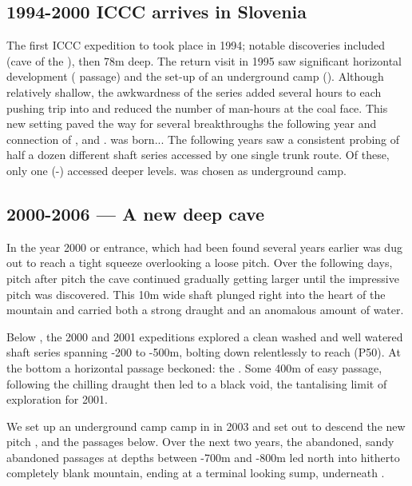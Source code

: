 \subsection{1994-2000  ICCC arrives in Slovenia} The first ICCC expedition to  took place in 1994; notable discoveries included  (cave of the ), then 78m deep. The return visit in 1995 saw significant horizontal development ( passage) and the set-up of an underground camp (). Although relatively shallow, the awkwardness of the  series added several hours to each pushing trip into  and reduced the number of man-hours at the coal face.
This new setting paved the way for several breakthroughs the following year and connection of ,  and .   was born... The following years saw a consistent probing of half a dozen different shaft series accessed by one single trunk route. Of these, only one (-) accessed deeper levels.  was chosen as underground camp.

\subsection{2000-2006 --- A new deep cave}

\label{sec:early vrtnarija}

 In the year 2000  or  entrance, which had been found several years earlier was dug out to reach a tight squeeze overlooking a loose pitch. Over the following days, pitch after pitch the cave continued gradually getting larger until the impressive  pitch was discovered. This 10m wide shaft plunged right into the heart of the mountain and carried both a strong draught and an anomalous amount of water. 

Below , the 2000 and 2001 expeditions explored a clean washed and well watered shaft series spanning -200 to -500m,  bolting down relentlessly to reach  (P50). At the bottom a horizontal passage beckoned: the . Some 400m of easy passage, following the chilling draught then led to a black void, the tantalising limit of exploration for 2001.
    
We set up an underground camp camp in  in 2003 and set out to descend the new pitch , and the passages below. Over the next two years, the abandoned, sandy abandoned passages at depths between -700m and -800m led north into hitherto completely blank mountain, ending at a terminal looking sump, underneath .


